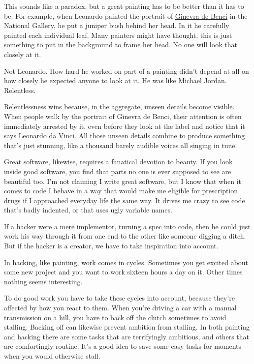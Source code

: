 This sounds like a paradox, but a great painting
has to be better than it has to be.
For example, when Leonardo
painted the portrait of \href{http://www.paulgraham.com/ginevra.html}{Ginevra de Benci}
in the National Gallery, he put a juniper bush behind her head.
In it he carefully
painted each individual leaf.  Many painters might have thought,
this is just something to put in the background to frame
her head.  No one will look that closely at it.

Not Leonardo.  How hard he worked on part of a painting didn't
depend at all on how closely he expected anyone to look at it.
He was like Michael Jordan.  Relentless.

Relentlessness wins because, in the aggregate, unseen details
become visible.
When people walk by the portrait of Ginevra de Benci,
their attention is often immediately arrested by it,
even before they look at the label and notice that it says
Leonardo da Vinci.  All those unseen details combine to produce
something that's just stunning, like a thousand barely audible
voices all singing in tune.

Great software, likewise, requires a fanatical devotion to
beauty.  If you look inside good software, you find that
parts no one is ever supposed to see are beautiful too.
I'm not claiming I write great software, but I
know that when it comes to code I behave in a way that would
make me eligible for prescription drugs if I approached everyday
life the same way.
It drives me crazy to see code that's badly indented,
or that uses ugly variable names.



If a hacker were a mere implementor, turning a spec into code, then
he could just work his way through it from one end to the other like
someone digging a ditch.  But if the hacker is a creator, we have
to take inspiration into account.

In hacking, like painting,
work comes in cycles.  Sometimes you get excited about some
new project and you want to work sixteen hours a day on it. 
Other times nothing seems interesting.

To do good work you have to take these cycles into
account, because they're affected by how you react to them.
When you're driving a
car with a manual transmission on a hill, you have to back off
the clutch sometimes to avoid stalling.  Backing
off can likewise prevent ambition from stalling.
In both painting and hacking there are some
tasks that are terrifyingly ambitious, and others that are
comfortingly routine.  It's a good idea to save some easy
tasks for moments when you would otherwise stall.

